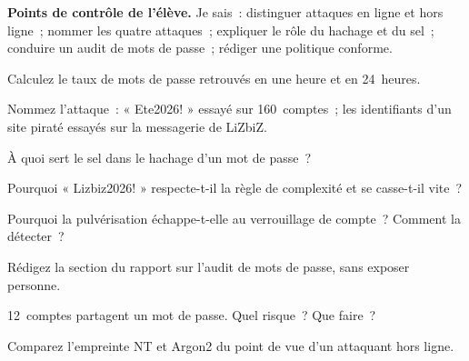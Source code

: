 \begin{boxinfo}
\textbf{Points de contrôle de l'élève.} Je sais~: distinguer attaques en
ligne et hors ligne~; nommer les quatre attaques~; expliquer le rôle du
hachage et du sel~; conduire un audit de mots de passe~; rédiger une
politique conforme.
\end{boxinfo}

\bigskip

\begin{boxexo}[title={\ding{45}\quad Exercice~13.1. Le taux \niveaubase}]
Calculez le taux de mots de passe retrouvés en une heure et en 24~heures.
\end{boxexo}

\begin{boxexo}[title={\ding{45}\quad Exercice~13.2. Quelle attaque~? \niveaubase}]
Nommez l'attaque~: « Ete2026! » essayé sur 160~comptes~; les identifiants
d'un site piraté essayés sur la messagerie de LiZbiZ.
\end{boxexo}

\begin{boxexo}[title={\ding{45}\quad Exercice~13.3. Le sel \niveaubase}]
À quoi sert le sel dans le hachage d'un mot de passe~?
\end{boxexo}

\begin{boxexo}[title={\ding{45}\quad Exercice~13.4. Complexité \niveaumoyen}]
Pourquoi « Lizbiz2026! » respecte-t-il la règle de complexité et se
casse-t-il vite~?
\end{boxexo}

\begin{boxexo}[title={\ding{45}\quad Exercice~13.5. Pulvérisation \niveaumoyen}]
Pourquoi la pulvérisation échappe-t-elle au verrouillage de compte~?
Comment la détecter~?
\end{boxexo}

\begin{boxexo}[title={\ding{45}\quad Exercice~13.6. Rapport \niveaumoyen}]
Rédigez la section du rapport sur l'audit de mots de passe, sans exposer
personne.
\end{boxexo}

\begin{boxexo}[title={\ding{45}\quad Exercice~13.7. Réutilisation \niveaumoyen}]
12~comptes partagent un mot de passe. Quel risque~? Que faire~?
\end{boxexo}

\begin{boxexo}[title={\ding{45}\quad Exercice~13.8. Hachage \niveaumoyen}]
Comparez l'empreinte NT et Argon2 du point de vue d'un attaquant hors
ligne.
\end{boxexo}

